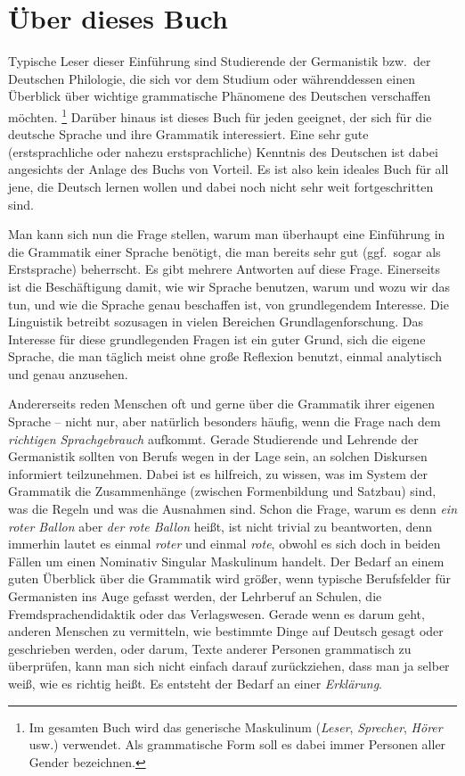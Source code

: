 

\section*{Über dieses Buch}
\label{sec:ueberdiesesbuch}

Typische Leser dieser Einführung sind Studierende der Germanistik bzw.\ der Deutschen Philologie, die sich vor dem Studium oder währenddessen einen Überblick über wichtige grammatische Phänomene des Deutschen verschaffen möchten.%
\footnote{Im gesamten Buch wird das generische Maskulinum (\textit{Leser}, \textit{Sprecher}, \textit{Hörer} usw.) verwendet.
Als grammatische Form soll es dabei immer Personen aller Gender bezeichnen.}
Darüber hinaus ist dieses Buch für jeden geeignet, der sich für die deutsche Sprache und ihre Grammatik interessiert.
Eine sehr gute (erstsprachliche oder nahezu erstsprachliche) Kenntnis des Deutschen ist dabei angesichts der Anlage des Buchs von Vorteil.
Es ist also kein ideales Buch für all jene, die Deutsch lernen wollen und dabei noch nicht sehr weit fortgeschritten sind.

Man kann sich nun die Frage stellen, warum man überhaupt eine Einführung in die Grammatik einer Sprache benötigt, die man bereits sehr gut (ggf.\ sogar als Erstsprache) beherrscht.
Es gibt mehrere Antworten auf diese Frage.
Einerseits ist die Beschäftigung damit, wie wir Sprache benutzen, warum und wozu wir das tun, und wie die Sprache genau beschaffen ist, von grundlegendem Interesse.
Die Linguistik betreibt sozusagen in vielen Bereichen Grundlagenforschung.
Das Interesse für diese grundlegenden Fragen ist ein guter Grund, sich die eigene Sprache, die man täglich meist ohne große Reflexion benutzt, einmal analytisch und genau anzusehen.

Andererseits reden Menschen oft und gerne über die Grammatik ihrer eigenen Sprache -- nicht nur, aber natürlich besonders häufig, wenn die Frage nach dem \textit{richtigen Sprachgebrauch} aufkommt.
Gerade Studierende und Lehrende der Germanistik sollten von Berufs wegen in der Lage sein, an solchen Diskursen informiert teilzunehmen.
Dabei ist es hilfreich, zu wissen, was im System der Grammatik die Zusammenhänge (\zB zwischen Formenbildung und Satzbau) sind, was die Regeln und was die Ausnahmen sind.
Schon die Frage, warum es denn \textit{ein roter Ballon} aber \textit{der rote Ballon} heißt, ist nicht trivial zu beantworten, denn immerhin lautet es einmal \textit{roter} und einmal \textit{rote}, obwohl es sich doch in beiden Fällen um einen Nominativ Singular Maskulinum handelt.
Der Bedarf an einem guten Überblick über die Grammatik wird größer, wenn typische Berufsfelder für Germanisten ins Auge gefasst werden, \zB der Lehrberuf an Schulen, die Fremdsprachendidaktik oder das Verlagswesen.
Gerade wenn es darum geht, anderen Menschen zu vermitteln, wie bestimmte Dinge auf Deutsch gesagt oder geschrieben werden, oder darum, Texte anderer Personen grammatisch zu überprüfen, kann man sich nicht einfach darauf zurückziehen, dass man ja selber weiß, wie es richtig heißt.
Es entsteht der Bedarf an einer \textit{Erklärung}.

